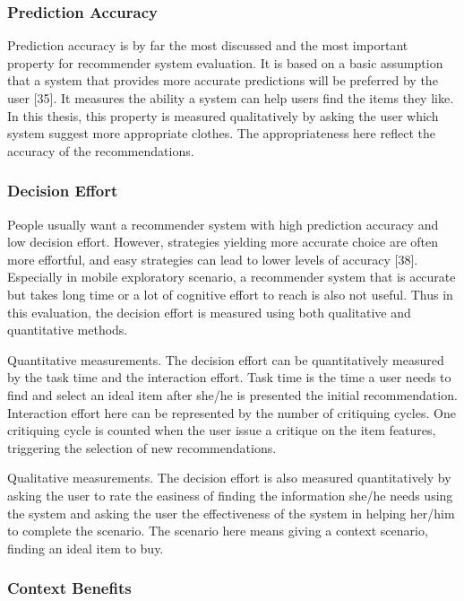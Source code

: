 \subsubsection{Prediction Accuracy} \label{sec:ts_tf_pa}

Prediction accuracy is by far the most discussed and the most important property for recommender system evaluation. It is based on a basic assumption that a system that provides more accurate predictions will be preferred by the user [35]. It measures the ability a system can help users find the items they like. In this thesis, this property is measured qualitatively by asking the user which system suggest more appropriate clothes. The appropriateness here reflect the accuracy of the recommendations. 

\subsubsection{Decision Effort} \label{sec:ts_tf_de}

People usually want a recommender system with high prediction accuracy and low decision effort. However, strategies yielding more accurate choice are often more effortful, and easy strategies can lead to lower levels of accuracy [38]. Especially in mobile exploratory scenario, a recommender system that is accurate but takes long time or a lot of cognitive effort to reach is also not useful. Thus in this evaluation, the decision effort is measured using both qualitative and quantitative methods.

Quantitative measurements. The decision effort can be quantitatively measured by the task time and the interaction effort. Task time is the time a user needs to find and select an ideal item after she/he is presented the initial recommendation. Interaction effort here can be represented by the number of critiquing cycles. One critiquing cycle is counted when the user issue a critique on the item features, triggering the selection of new recommendations.

Qualitative measurements. The decision effort is also measured quantitatively by asking the user to rate the easiness of finding the information she/he needs using the system and asking the user the effectiveness of the system in helping her/him to complete the scenario. The scenario here means giving a context scenario, finding an ideal item to buy.

\subsubsection{Context Benefits} \label{sec:ts_tf_cb}

